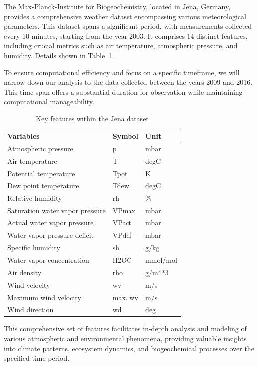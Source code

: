 \documentclass[12pt]{article}
\begin{document}
The Max-Planck-Institute for Biogeochemistry, located in Jena, Germany, provides a comprehensive weather dataset encompassing various meteorological parameters. This dataset spans a significant period, with measurements collected every 10 minutes, starting from the year 2003. It comprises 14 distinct features, including crucial metrics such as air temperature, atmospheric pressure, and humidity. Details shown in Table~\ref{tab:Jena}.

To ensure computational efficiency and focus on a specific timeframe, we will narrow down our analysis to the data collected between the years 2009 and 2016. This time span offers a substantial duration for observation while maintaining computational manageability.

\begin{table}[htpb]
	\centering
	\caption{Key features within the Jena dataset}
	\label{tab:Jena}
	\begin{tabular}{lll}
	\toprule
	Variables & Symbol & Unit\\
	\midrule
	Atmospheric pressure & p & mbar\\
	Air temperature & T & degC\\
	Potential temperature & Tpot & K\\
	Dew point temperature & Tdew & degC\\
	Relative humidity & rh & \%\\
	Saturation water vapor pressure & VPmax & mbar\\
	Actual water vapor pressure & VPact & mbar\\
	Water vapor pressure deficit & VPdef & mbar\\
	Specific humidity & sh & g/kg\\
	Water vapor concentration & H2OC & mmol/mol\\
	Air density & rho & g/m**3 \\
	Wind velocity & wv & m/s\\
	Maximum wind velocity & max. wv & m/s\\
	Wind direction & wd & deg\\
	\bottomrule
	\end{tabular}
\end{table}



This comprehensive set of features facilitates in-depth analysis and modeling of various atmospheric and environmental phenomena, providing valuable insights into climate patterns, ecosystem dynamics, and biogeochemical processes over the specified time period.
\end{document}
